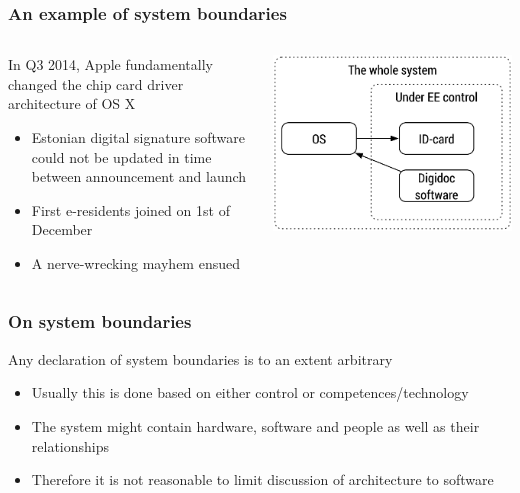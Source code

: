 \begin{frame}[label=Yosemite]
	\frametitle{An example of system boundaries}
	\begin{columns}[t]
		\begin{column}{6.5cm}
			In Q3 2014, Apple fundamentally changed the chip card driver architecture of OS X
			\begin{itemize}
				\item Estonian digital signature software could not be updated in time between announcement and launch
				\item First e-residents joined on 1st of December
				\item A nerve-wrecking mayhem ensued
			\end{itemize}
		\end{column}
		\begin{column}[T]{4.5cm}
			\includegraphics[width=\textwidth]{yosemite.pdf}
		\end{column}
	\end{columns}
\end{frame}


\begin{frame}[fragile]
  \frametitle{On system boundaries}
  		Any declaration of system boundaries is to an extent arbitrary
		\begin{itemize}
			\item Usually this is done based on either control or competences/technology
			\item The system might contain hardware, software and people as well as their relationships
			\item Therefore it is not reasonable to limit discussion of architecture to software
		\end{itemize}

\end{frame}

